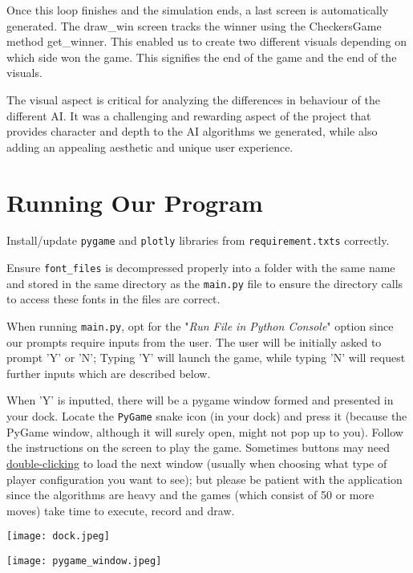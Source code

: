 \documentclass[fontsize=11pt]{article}
\begin{document}
Once this loop finishes and the simulation ends, a last screen is automatically generated. The draw\_win screen tracks the winner using the CheckersGame method get\_winner. This enabled us to create two different visuals depending on which side won the game. This signifies the end of the game and the end of the visuals.

The visual aspect is critical for analyzing the differences in behaviour of the different AI. It was a challenging and rewarding aspect of the project that provides character and depth to the AI algorithms we generated, while also adding an appealing aesthetic and unique user experience.



\section*{Running Our Program}

Install/update \texttt{pygame} and \texttt{plotly} libraries from \texttt{requirement.txts} correctly.

Ensure \texttt{font\_files} is decompressed properly into a folder with the same name and stored in the same directory as the \texttt{main.py} file to ensure the directory calls to access these fonts in the files are correct.

When running \texttt{main.py}, opt for the "\textit{Run File in Python Console}" option since our prompts require inputs from the user. The user will be initially asked to prompt 'Y' or 'N'; Typing 'Y' will launch the game, while typing 'N' will request further inputs which are described below.

When 'Y' is inputted, there will be a pygame window formed and presented in your dock. Locate the \texttt{PyGame} snake icon (in your dock) and press it (because the PyGame window, although it will surely open, might not pop up to you). Follow the instructions on the screen to play the game. Sometimes buttons may need \underline{double-clicking} to load the next window (usually when choosing what type of player configuration you want to see); but please be patient with the application since the algorithms are heavy and the games (which consist of 50 or more moves) take time to execute, record and draw.

{\texttt{[image: dock.jpeg]}}

\newline

{\texttt{[image: pygame\_window.jpeg]}}
\end{document}
